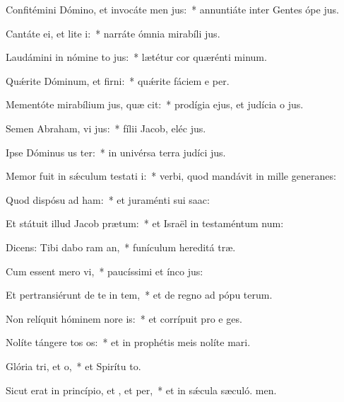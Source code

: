 \item Confitémini Dómino, et invocáte men jus:~* annuntiáte inter Gentes ópe jus.
\item Cantáte ei, et lite i:~* narráte ómnia mirabíli jus.
\item Laudámini in nómine to jus:~* lætétur cor quærénti minum.
\item Quǽrite Dóminum, et firni:~* quǽrite fáciem e per.
\item Mementóte mirabílium jus, quæ cit:~* prodígia ejus, et judícia o jus.
\item Semen Abraham, vi jus:~* fílii Jacob, eléc jus.
\item Ipse Dóminus us ter:~* in univérsa terra judíci jus.
\item Memor fuit in sǽculum testati i:~* verbi, quod mandávit in mille generanes:
\item Quod dispósu ad ham:~* et juraménti sui  saac:
\item Et státuit illud Jacob  prætum:~* et Israël in testaméntum num:
\item Dicens: Tibi dabo ram an,~* funículum hereditá træ.
\item Cum essent mero vi,~* paucíssimi et ínco jus:
\item Et pertransiérunt de te in tem,~* et de regno ad pópu terum.
\item Non relíquit hóminem nore is:~* et corrípuit pro e ges.
\item Nolíte tángere tos os:~* et in prophétis meis nolíte mari.
\item Glória tri, et o,~* et Spirítu to.
\item Sicut erat in princípio, et , et per,~* et in sǽcula sæculó. men.

